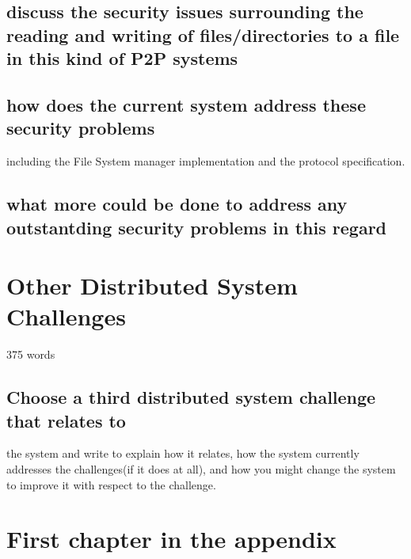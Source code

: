 \documentclass[10pt,a4paper]{report}
\begin{document}
\section{discuss the security issues surrounding the reading and writing of files/directories to a file in this kind of P2P systems}
\section{how does the current system address these security problems}
including the File System manager implementation and the protocol specification.
\section{what more could be done to address any outstantding security problems in this regard}
\chapter{Other Distributed System Challenges}
375 words
\section{Choose a third distributed system challenge that relates to}
the system and write to explain how it relates, how the system currently addresses the challenges(if it does at all), and how you might change the system to improve it with respect to the challenge.
\appendix
\chapter{First chapter in the appendix}
\end{document}
